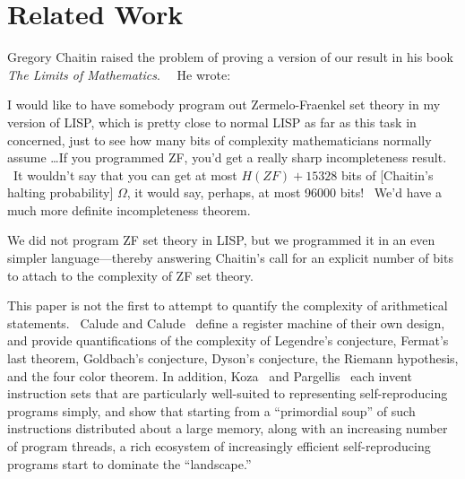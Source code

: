 \documentclass[11pt]{article}
\begin{document}
\section{Related Work}

Gregory Chaitin raised the problem of proving a version of our result in his book \emph{The Limits of Mathematics}.~\cite{chaitin} \ He wrote:

\begin{displayquote}
\noindent I would like to have somebody program out Zermelo-Fraenkel set theory in my version of LISP, which is pretty close to normal LISP as far as this task in concerned, just to see how many bits of complexity mathematicians normally assume \dots If you programmed ZF, you'd get a really sharp incompleteness result. \ It wouldn't say that you can get at most $H(ZF) + 15328$ bits of [Chaitin's halting probability] $\Omega$, it would say, perhaps, at most 96000 bits! \ We'd have a much more definite incompleteness theorem.
\end{displayquote}

We did not program ZF set theory in LISP, but we programmed it in an even simpler language---thereby answering Chaitin's call for an explicit number of bits to attach to the complexity of ZF set theory.

This paper is not the first to attempt to quantify the complexity of arithmetical statements. \ Calude and Calude~\cite{calude} define a register machine of their own design, and provide quantifications of the complexity of Legendre's conjecture, Fermat's last theorem, Goldbach's conjecture, Dyson's conjecture, the Riemann hypothesis, and the four color theorem.\footnotemark
{}
In addition, Koza~\cite{koza} and Pargellis~\cite{pargellis} each invent instruction sets that are particularly well-suited to representing self-reproducing programs simply, and show that starting from a ``primordial soup'' of such instructions distributed about a large memory, along with an increasing number of program threads, a rich ecosystem of increasingly efficient self-reproducing programs start to dominate the ``landscape.''
\end{document}
